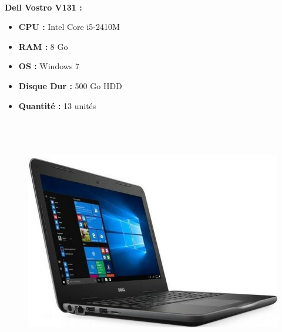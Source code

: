 \documentclass[11pt,a4paper,oneside]{article}
\begin{document}
\paragraph{}\textbf{Dell Vostro V131 :} \\
\begin{itemize}
\item \textbf{CPU :} Intel Core i5-2410M
\item \textbf{RAM :} 8 Go
\item \textbf{OS :} Windows 7
\item \textbf{Disque Dur :} 500 Go HDD
\item \textbf{Quantité :} 13 unités
\\ \\ \\ \\
\end{itemize} 
\begin{figure}
\includegraphics[scale=0.4]{Ressources/Materiel/L3380.jpg}\vspace{-2cm}
\end{figure}
\end{document}
